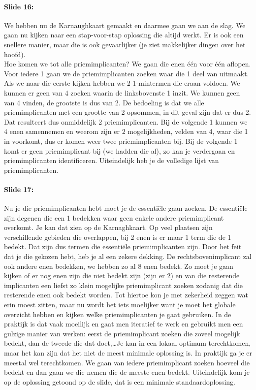 \documentclass[10pt,a4paper]{book}
\begin{document}
\paragraph{Slide 16:} We hebben nu de Karnaughkaart gemaakt en daarmee gaan we aan de slag. We gaan nu kijken naar een stap-voor-stap oplossing die altijd werkt. Er is ook een snellere manier, maar die is ook gevaarlijker (je ziet makkelijker dingen over het hoofd).\\
Hoe komen we tot alle priemimplicanten? We gaan die enen \'e\'en voor \'e\'en aflopen. Voor iedere 1 gaan we de priemimplicanten zoeken waar die 1 deel van uitmaakt. Als we naar die eerste kijken hebben we 2 1-mintermen die eraan voldoen. We kunnen er geen van 4 zoeken waarin de linksbovenste 1 inzit. We kunnen geen van 4 vinden, de grootste is dus van 2. De bedoeling is dat we alle priemimplicanten met een grootte van 2 opsommen, in dit geval zijn dat er dus 2. Dat resulteert dus onmiddelijk 2 priemimplicanten. Bij de volgende 1 kunnen we 4 enen samennemen en weerom zijn er 2 mogelijkheden, velden van 4, waar die 1 in voorkomt, dus er komen weer twee priemimplicanten bij. Bij de volgende 1 komt er geen priemimplicant bij (we hadden die al), zo kan je verdergaan en priemimplicanten identificeren. Uiteindelijk heb je de volledige lijst van priemimplicanten. 

\paragraph{Slide 17:} Nu je die priemimplicanten hebt moet je de essenti\"ele gaan zoeken. De essenti\"ele zijn degenen die een 1 bedekken waar geen enkele andere priemimplicant overkomt. Je kan dat zien op de Karnaghkaart. Op veel plaatsen zijn verschillende gebieden die overlappen, bij 2 enen is er maar 1 term die de 1 bedekt. Dat zijn dus termen die essenti\"ele priemimplicanten zijn. Door het feit dat je die gekozen hebt, heb je al een zekere dekking. De rechtsbovenimplicant zal ook andere enen bedekken, we hebben zo al 8 enen bedekt. Zo moet je gaan kijken of er nog enen zijn die niet bedekt zijn (zijn er 2) en van die resterende implicanten een liefst zo klein mogelijke priemimplicant zoeken zodanig dat die resterende enen ook bedekt worden. Tot hiertoe kon je met zekerheid zeggen wat erin moest zitten, maar nu wordt het iets moelijker want je moet het globale overzicht hebben en kijken welke priemimplicanten je gaat gebruiken. In de praktijk is dat vaak moeilijk en gaat men iteratief te werk en gebruikt men een gulzige manier van werken: eerst de priemimplicant zoeken die zoveel mogelijk bedekt, dan de tweede die dat doet,\ldots Je kan in een lokaal optimum terechtkomen, maar het kan zijn dat het niet de meest minimale oplossing is. In praktijk ga je er meestal wel terechtkomen. We gaan van iedere priemimplicant zoeken hoeveel die bedekt en dan gaan we die nemen die de meeste enen bedekt. Uiteindelijk kom je op de oplossing getoond op de slide, dat is een minimale standaardoplossing.
\end{document}
